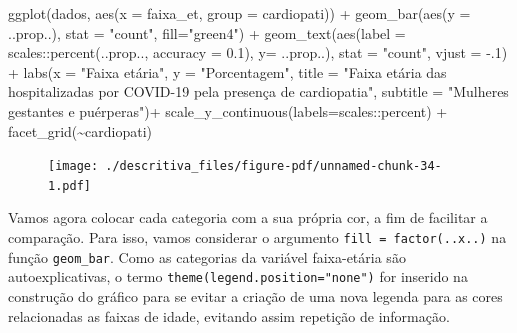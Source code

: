 \documentclass[
  letterpaper,
  DIV=11,
  numbers=noendperiod]{scrreprt}
\newenvironment{Shaded}{\begin{snugshade}}{\end{snugshade}}
\newcommand{\AttributeTok}[1]{\textcolor[rgb]{0.40,0.45,0.13}{#1}}
\newcommand{\DecValTok}[1]{\textcolor[rgb]{0.68,0.00,0.00}{#1}}
\newcommand{\FloatTok}[1]{\textcolor[rgb]{0.68,0.00,0.00}{#1}}
\newcommand{\FunctionTok}[1]{\textcolor[rgb]{0.28,0.35,0.67}{#1}}
\newcommand{\NormalTok}[1]{\textcolor[rgb]{0.00,0.23,0.31}{#1}}
\newcommand{\SpecialCharTok}[1]{\textcolor[rgb]{0.37,0.37,0.37}{#1}}
\newcommand{\StringTok}[1]{\textcolor[rgb]{0.13,0.47,0.30}{#1}}
\begin{document}
\begin{Shaded}
\begin{Highlighting}[]
\FunctionTok{ggplot}\NormalTok{(dados, }\FunctionTok{aes}\NormalTok{(}\AttributeTok{x =}\NormalTok{ faixa\_et, }\AttributeTok{group =}\NormalTok{ cardiopati)) }\SpecialCharTok{+}  
  \FunctionTok{geom\_bar}\NormalTok{(}\FunctionTok{aes}\NormalTok{(}\AttributeTok{y =}\NormalTok{ ..prop..), }\AttributeTok{stat =} \StringTok{"count"}\NormalTok{, }\AttributeTok{fill=}\StringTok{"green4"}\NormalTok{) }\SpecialCharTok{+} 
  \FunctionTok{geom\_text}\NormalTok{(}\FunctionTok{aes}\NormalTok{(}\AttributeTok{label =}\NormalTok{ scales}\SpecialCharTok{::}\FunctionTok{percent}\NormalTok{(..prop.., }\AttributeTok{accuracy =} \FloatTok{0.1}\NormalTok{), }\AttributeTok{y=}\NormalTok{ ..prop..), }\AttributeTok{stat =} \StringTok{"count"}\NormalTok{, }\AttributeTok{vjust =} \SpecialCharTok{{-}}\NormalTok{.}\DecValTok{1}\NormalTok{) }\SpecialCharTok{+}
  \FunctionTok{labs}\NormalTok{(}\AttributeTok{x =} \StringTok{"Faixa etária"}\NormalTok{, }\AttributeTok{y =} \StringTok{"Porcentagem"}\NormalTok{, }\AttributeTok{title =} \StringTok{"Faixa etária das hospitalizadas por COVID{-}19 pela presença de cardiopatia"}\NormalTok{, }\AttributeTok{subtitle =} \StringTok{"Mulheres gestantes e puérperas"}\NormalTok{)}\SpecialCharTok{+}
  \FunctionTok{scale\_y\_continuous}\NormalTok{(}\AttributeTok{labels=}\NormalTok{scales}\SpecialCharTok{::}\NormalTok{percent) }\SpecialCharTok{+}
  \FunctionTok{facet\_grid}\NormalTok{(}\SpecialCharTok{\textasciitilde{}}\NormalTok{cardiopati)}
\end{Highlighting}
\end{Shaded}

\begin{figure}[H]

{\centering \texttt{[image: ./descritiva\_files/figure-pdf/unnamed-chunk-34-1.pdf]}

}

\end{figure}

Vamos agora colocar cada categoria com a sua própria cor, a fim de
facilitar a comparação. Para isso, vamos considerar o argumento
\texttt{fill\ =\ factor(..x..)} na função \texttt{geom\_bar}. Como as
categorias da variável faixa-etária são autoexplicativas, o termo
\texttt{theme(legend.position="none")} for inserido na construção do
gráfico para se evitar a criação de uma nova legenda para as cores
relacionadas as faixas de idade, evitando assim repetição de informação.
\end{document}
